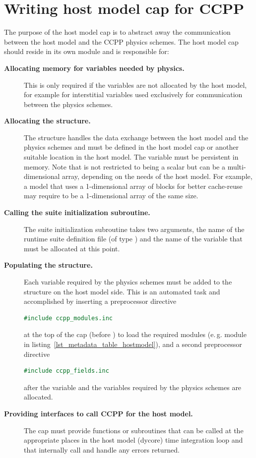 \section{Writing host model cap for CCPP}
\label{sec_hostmodel_cap}
The purpose of the host model cap is to abstract away the communication between the host model and the CCPP physics schemes. The host model cap should reside in its own module and is responsible for:
\begin{description}
\item[\textbf{Allocating memory for variables needed by physics.}] This is only required if the variables are not allocated by the host model, for example for interstitial variables used exclusively for communication between the physics schemes.
\item[\textbf{Allocating the  structure.}] The  structure handles the data exchange between the host model and the physics schemes and must be defined in the host model cap or another suitable location in the host model. The  variable must be persistent in memory. Note that  is not restricted to being a scalar but can be a multi-dimensional array, depending on the needs of the host model. For example, a model that uses a 1-dimensional array of blocks for better cache-reuse may require  to be a 1-dimensional array of the same size.
\item[\textbf{Calling the suite initialization subroutine.}] The suite initialization subroutine takes two arguments, the name of the runtime suite definition file (of type ) and the name of the  variable that must be allocated at this point.
\item[\textbf{Populating the  structure.}] Each variable required by the physics schemes must be added to the  structure on the host model side. This is an automated task and accomplished by inserting a preprocessor directive
\begin{lstlisting}[language=Fortran]
#include ccpp_modules.inc
\end{lstlisting}
at the top of the cap (before ) to load the required modules (e.\,g. module  in listing~\ref{lst_metadata_table_hostmodel}), and a second preprocessor directive
\begin{lstlisting}[language=Fortran]
#include ccpp_fields.inc
\end{lstlisting}
after the  variable and the variables required by the physics schemes are allocated.
\item[\textbf{Providing interfaces to call CCPP for the host model.}] The cap must provide functions or subroutines that can be called at the appropriate places in the host model (dycore) time integration loop and that internally call  and handle any errors returned.
\end{description}
